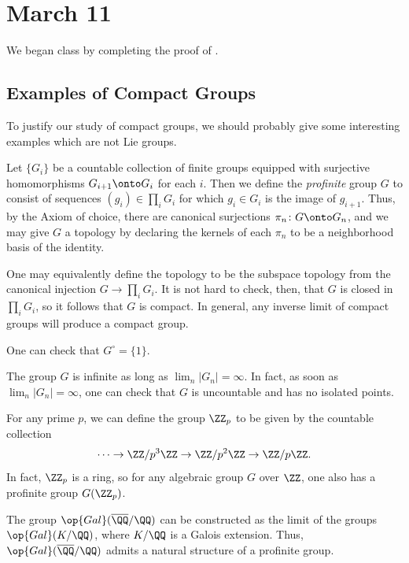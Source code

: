 \documentclass[../notes.tex]{subfiles}
\begin{document}
\section{March 11}
We began class by completing the proof of .

\subsection{Examples of Compact Groups}
To justify our study of compact groups, we should probably give some interesting examples which are not Lie groups.
\begin{definition}[profinite]
	Let $\{G_i\}$ be a countable collection of finite groups equipped with surjective homomorphisms $G_{i+1}\onto G_i$ for each $i$. Then we define the \textit{profinite} group $G$ to consist of sequences $(g_i)\in\prod_iG_i$ for which $g_i\in G_i$ is the image of $g_{i+1}$. Thus, by the Axiom of choice, there are canonical surjections $\pi_n\colon G\onto G_n$, and we may give $G$ a topology by declaring the kernels of each $\pi_n$ to be a neighborhood basis of the identity.
\end{definition}
\begin{remark}
	One may equivalently define the topology to be the subspace topology from the canonical injection $G\to\prod_iG_i$. It is not hard to check, then, that $G$ is closed in $\prod_iG_i$, so it follows that $G$ is compact. In general, any inverse limit of compact groups will produce a compact group.
\end{remark}
\begin{remark}
	One can check that $G^\circ=\{1\}$.
\end{remark}
\begin{remark}
	The group $G$ is infinite as long as $\lim_n\left|G_n\right|=\infty$. In fact, as soon as $\lim_n\left|G_n\right|=\infty$, one can check that $G$ is uncountable and has no isolated points.
\end{remark}
\begin{example}
	For any prime $p$, we can define the group $\ZZ_p$ to be given by the countable collection
	\[\cdots\to\ZZ/p^3\ZZ\to\ZZ/p^2\ZZ\to\ZZ/p\ZZ.\]
	In fact, $\ZZ_p$ is a ring, so for any algebraic group $G$ over $\ZZ$, one also has a profinite group $G(\ZZ_p)$.
\end{example}
\begin{example}
	The group $\op{Gal}(\overline\QQ/\QQ)$ can be constructed as the limit of the groups $\op{Gal}(K/\QQ)$, where $K/\QQ$ is a Galois extension. Thus, $\op{Gal}(\overline\QQ/\QQ)$ admits a natural structure of a profinite group.
\end{example}
\end{document}
